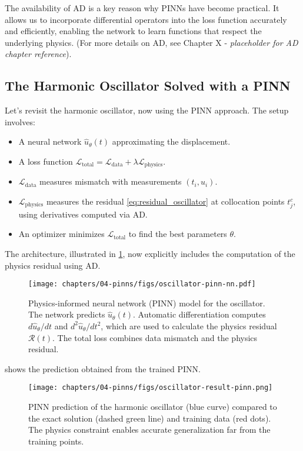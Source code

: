 The availability of AD is a key reason why PINNs have become practical. It allows us to incorporate differential operators into the loss function accurately and efficiently, enabling the network to learn functions that respect the underlying physics. (For more details on AD, see Chapter X - \textit{placeholder for AD chapter reference}).

\subsection{The Harmonic Oscillator Solved with a PINN}

Let's revisit the harmonic oscillator, now using the PINN approach. The setup involves:
\begin{itemize}
    \item A neural network $\hat{u}_\theta(t)$ approximating the displacement.
    \item A loss function $\mathcal{L}_{\text{total}} = \mathcal{L}_{\text{data}} + \lambda\mathcal{L}_{\text{physics}}$.
    \item $\mathcal{L}_{\text{data}}$ measures mismatch with measurements $(t_i, u_i)$.
    \item $\mathcal{L}_{\text{physics}}$ measures the residual \eqref{eq:residual_oscillator} at collocation points $t_j^c$, using derivatives computed via AD.
    \item An optimizer minimizes $\mathcal{L}_{\text{total}}$ to find the best parameters $\theta$.
\end{itemize}
The architecture, illustrated in \cref{fig:oscillator_pinn_nn}, now explicitly includes the computation of the physics residual using AD.

\begin{figure}[htbp]
    \centering
    \texttt{[image: chapters/04-pinns/figs/oscillator-pinn-nn.pdf]}
    \caption{Physics-informed neural network (PINN) model for the oscillator. The network predicts $\hat{u}_\theta(t)$. Automatic differentiation computes $d\hat{u}_\theta/dt$ and $d^2\hat{u}_\theta/dt^2$, which are used to calculate the physics residual $\mathcal{R}(t)$. The total loss combines data mismatch and the physics residual.}
    \label{fig:oscillator_pinn_nn}
\end{figure}

 shows the prediction obtained from the trained PINN.

\begin{figure}[htbp]
    \centering
    \texttt{[image: chapters/04-pinns/figs/oscillator-result-pinn.png]}
    \caption{PINN prediction of the harmonic oscillator (blue curve) compared to the exact solution (dashed green line) and training data (red dots). The physics constraint enables accurate generalization far from the training points.}
    \label{fig:oscillator_result_pinn}
\end{figure}

